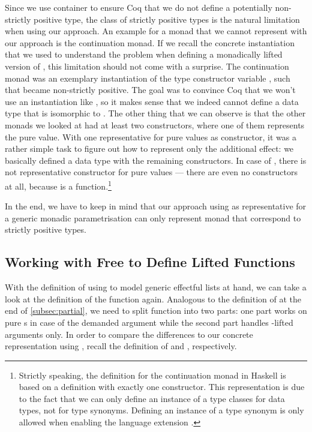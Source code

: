 Since we use container to ensure Coq that we do not define a
potentially non-strictly positive type, the class of strictly positive
types is the natural limitation when using our approach.
An example for a monad that we cannot represent with our approach is
the continuation monad.
If we recall the concrete instantiation that we used to understand the
problem when defining a monadically lifted version of ,
this limitation should not come with a surprise.
The continuation monad  was an exemplary instantiation of
the type constructor variable , such that  became
non-strictly positive.
The goal was to convince Coq that we won't use an instantiation like
, so it makes sense that we indeed cannot define a data
type that is isomorphic to . 
The other thing that we can observe is that the other monads we looked
at had at least two constructors, where one of them represents the
pure value.
With one representative for pure values as constructor, it was a
rather simple task to figure out how to represent only the additional
effect: we basically defined a data type with the remaining
constructors.
In case of , there is not representative constructor for
pure values --- there are even no constructors at all, because
 is a function.\footnote{Strictly speaking, the definition
  for the continuation monad in Haskell is based on a 
  definition with exactly one constructor. This representation is due
  to the fact that we can only define an instance of a type classes
  for data types, not for type synonyms. Defining an instance of a type
synonym is only allowed when enabling the language extension
.}

In the end, we have to keep in mind that our approach using
 as representative for a generic monadic parametrisation
can only represent monad that correspond to strictly positive types.

\subsection{Working with Free to Define Lifted Functions}

With the definition of  using  to model generic
effectful lists at hand, we can take a look at the definition of the
function  again.
Analogous to the definition of  at the end of
\autoref{subsec:partial}, we need to split function into two parts:
one part works on pure s in case of the demanded argument
while the second part handles -lifted arguments only.
In order to compare the differences to our concrete representation
using , recall the definition of  and
, respectively.

